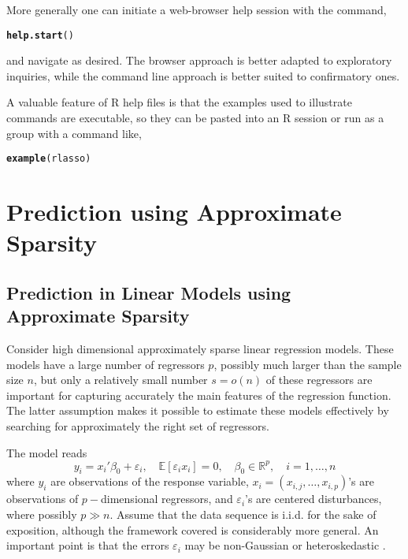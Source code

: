 \documentclass{amsart}\usepackage[]{graphicx}\usepackage[]{color}
\makeatletter
\newcommand{\hlstd}[1]{\textcolor[rgb]{0.345,0.345,0.345}{#1}}%
\newcommand{\hlkwd}[1]{\textcolor[rgb]{0.737,0.353,0.396}{\textbf{#1}}}%
\newenvironment{kframe}{%
 \def\at@end@of@kframe{}%
 \ifinner\ifhmode%
  \def\at@end@of@kframe{\end{minipage}}%
  \begin{minipage}{\columnwidth}%
 \fi\fi%
 \def\FrameCommand##1{\hskip\@totalleftmargin \hskip-\fboxsep
 \colorbox{shadecolor}{##1}\hskip-\fboxsep
     \hskip-\linewidth \hskip-\@totalleftmargin \hskip\columnwidth}%
 \MakeFramed {\advance\hsize-\width
   \@totalleftmargin\z@ \linewidth\hsize
   \@setminipage}}%
 {\par\unskip\endMakeFramed%
 \at@end@of@kframe}
\newenvironment{knitrout}{}{} %
\newcommand{\R}{{\normalfont\textsf{R }}{}}
\makeatother
\begin{document}
More generally one can initiate a web-browser help session with the command,
\begin{knitrout}
\color{fgcolor}\begin{kframe}
\begin{alltt}
 \hlkwd{help.start}\hlstd{()}
\end{alltt}
\end{kframe}
\end{knitrout}
and navigate as desired.  The browser approach is better adapted to exploratory inquiries, while the command line approach is better suited to confirmatory ones.

A valuable feature of \R help files is that the examples used to illustrate commands are executable, so they can be pasted into an \R session or run as a group with
a command like,

\begin{knitrout}
\color{fgcolor}\begin{kframe}
\begin{alltt}
\hlkwd{example}\hlstd{(rlasso)}
\end{alltt}
\end{kframe}
\end{knitrout}



\section{Prediction using Approximate Sparsity}


\subsection{Prediction in Linear Models using Approximate Sparsity}


Consider high dimensional approximately sparse linear regression models. These models have a large number of regressors $p$, possibly much larger than the sample size $n$, but only a relatively small number $s =o(n)$ of these regressors are important for capturing accurately the main features of the regression function. The latter assumption makes it possible to estimate these models effectively by searching for approximately the right set of regressors.

The model reads \[ y_i = x_i' \beta_0  + \varepsilon_i, \quad \mathbb{E}[\varepsilon_i x_i]=0, \quad \beta_0 \in \mathbb{R}^p, 
\quad i=1,\ldots,n \]
where $y_i$ are observations of the response variable, $x_i=(x_{i,j}, \ldots, x_{i,p})$'s are observations of $p-$dimensional  regressors, and $\varepsilon_i$'s are centered disturbances, where possibly $p \gg n$.   Assume that the data sequence is
i.i.d. for the sake of exposition, although the framework covered is considerably more general. An important point is that the errors $\varepsilon_i$ may be non-Gaussian or heteroskedastic \citep{BCCH12}.
\end{document}
